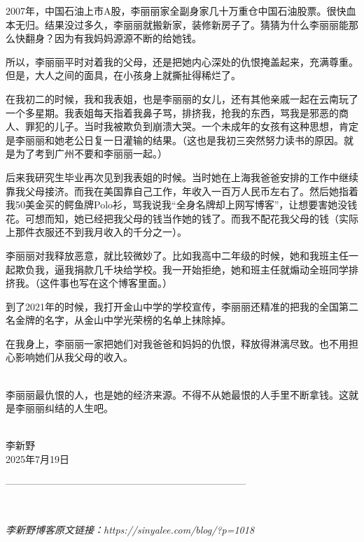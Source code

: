 2007年，中国石油上市A股，李丽丽家全副身家几十万重仓中国石油股票。很快血本无归。结果没过多久，李丽丽就搬新家，装修新房子了。猜猜为什么李丽丽能那么快翻身？因为有我妈妈源源不断的给她钱。

所以，李丽丽平时对着我的父母，还是把她内心深处的仇恨掩盖起来，充满尊重。但是，大人之间的面具，在小孩身上就撕扯得稀烂了。

在我初二的时候，我和我表姐，也是李丽丽的女儿，还有其他亲戚一起在云南玩了一个多星期。我表姐每天指着我鼻子骂，排挤我，抢我的东西，骂我是邪恶的商人、罪犯的儿子。当时我被欺负到崩溃大哭。一个未成年的女孩有这种思想，肯定是李丽丽和她老公日复一日灌输的结果。（这也是我初三突然努力读书的原因。就是为了考到广州不要和李丽丽一起。）

后来我研究生毕业再次见到我表姐的时候。当时她在上海我爸爸安排的工作中继续靠我父母接济。而我在美国靠自己工作，年收入一百万人民币左右了。然后她指着我50美金买的鳄鱼牌Polo衫，骂我说我``全身名牌却上网写博客''，让想要害她没钱花。可想而知，她已经把我父母的钱当作她的钱了。而我不配花我父母的钱（实际上那件衣服还不到我月收入的千分之一）。

李丽丽对我释放恶意，就比较微妙了。比如我高中二年级的时候，她和我班主任一起欺负我，逼我捐款几千块给学校。我一开始拒绝，她和班主任就煽动全班同学排挤我。（这件事也写在这个博客里面。）

到了2021年的时候，我打开金山中学的学校宣传，李丽丽还精准的把我的全国第二名金牌的名字，从金山中学光荣榜的名单上抹除掉。

在我身上，李丽丽一家把她们对我爸爸和妈妈的仇恨，释放得淋漓尽致。也不用担心影响她们从我父母的收入。

\ \\
李丽丽最仇恨的人，也是她的经济来源。不得不从她最恨的人手里不断拿钱。这就是李丽丽纠结的人生吧。

\ \\
李新野\\
2025年7月19日

--------------------------------------------------------------------------

\

\textit{李新野博客原文链接：https://sinyalee.com/blog/?p=1018}
